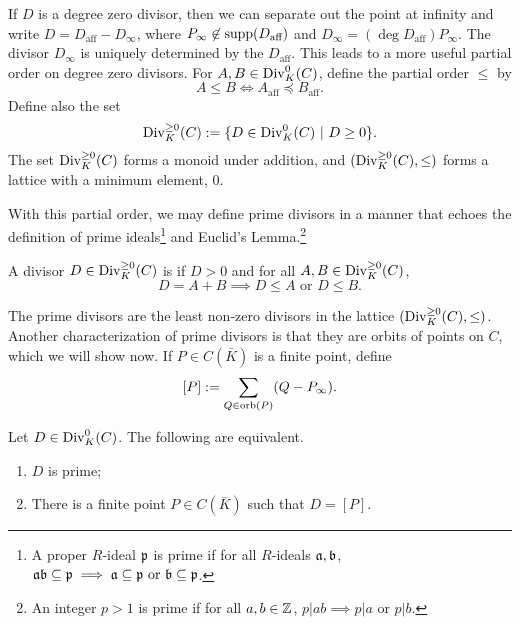 If $D$ is a degree zero divisor,
then we can separate out the point at infinity and write $D = D_{\text{aff}} - D_\infty$,
where $P_\infty \not\in \operatorname{supp}(D_{\text{aff}})$ and $D_\infty = (\deg D_{\text{aff}})P_\infty$.
The divisor $D_\infty$ is uniquely determined by the $D_{\text{aff}}$.
This leads to a more useful partial order on degree zero divisors.
For $A, B \in \operatorname{Div}_K^0(C)$, define the partial order $\leq$ by
  \[ A \leq B \iff A_{\text{aff}} \preceq B_{\text{aff}}. \]
Define also the set
  \[ \operatorname{Div}_K^{\geq 0}(C) := \{ D \in \operatorname{Div}_K^0(C) ~|~ D \geq 0 \}. \]
The set $\operatorname{Div}_K^{\geq 0}(C)$ forms a monoid under addition,
and $(\operatorname{Div}_K^{\geq 0}(C), \leq)$ forms a lattice with a minimum element, 0.

With this partial order, we may define prime divisors in a manner that echoes
the definition of prime ideals\footnote{
A proper $R$-ideal $\frak p$ is prime if for all $R$-ideals $\frak a, \frak b$,
$\frak{ab} \subseteq \frak p \implies \frak a \subseteq \frak p \text{ or } \frak b \subseteq \frak p$.}
and Euclid's Lemma.\!\footnote{
An integer $p > 1$ is prime if for all $a,b \in \mathbb{Z}$, $p | ab \implies p | a \text{ or } p | b$.}
\begin{definition}
  A divisor $D \in \operatorname{Div}_K^{\geq 0}(C)$ is  if $D > 0$ and for all $A, B \in \operatorname{Div}_K^{\geq 0}(C)$,
  \[ D = A + B \implies D \leq A \text{ or } D \leq B. \]
\end{definition}
The prime divisors are the least non-zero divisors in the lattice $(\operatorname{Div}_K^{\geq 0}(C), \leq)$.
Another characterization of prime divisors is that they are orbits of points on $C$, which we will show now.
If $P \in C(\bar K)$ is a finite point, define
\[ [P] := \sum_{Q \in \operatorname{orb}(P)}(Q - P_\infty). \]
\begin{proposition}
  \label{prop_prime_divisors}
  Let $D \in \operatorname{Div}_K^0(C)$. The following are equivalent.
  \begin{enumerate}[label=(\roman*)]
    \item $D$ is prime;
    \item There is a finite point $P \in C(\bar K)$ such that $D = [P]$.
  \end{enumerate}
\end{proposition}
